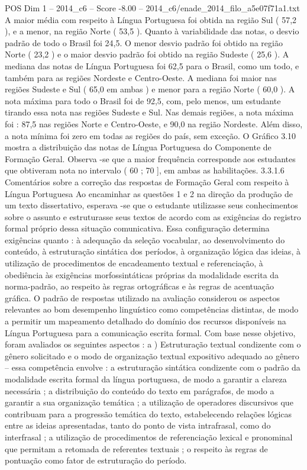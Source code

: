 \begin{textsample}{POS Dim 1 – 2014\_c6 – Score -8.00 – 2014\_c6/enade\_2014\_filo\_a5e07f71a1.txt}
A maior média com respeito à Língua Portuguesa foi obtida na região Sul ( 57,2 ), e a menor, na região Norte ( 53,5 ).
Quanto à variabilidade das notas, o desvio padrão de todo o Brasil foi 24,5.
O menor desvio padrão foi obtido na região Norte ( 23,2 ) e o maior desvio padrão foi obtido na região Sudeste ( 25,6 ).
A mediana das notas de Língua Portuguesa foi 62,5 para o Brasil, como um todo, e também para as regiões Nordeste e Centro-Oeste.
A mediana foi maior nas regiões Sudeste e Sul ( 65,0 em ambas ) e menor para a região Norte ( 60,0 ).
A nota máxima para todo o Brasil foi de 92,5, com, pelo menos, um estudante tirando essa nota nas regiões Sudeste e Sul.
Nas demais regiões, a nota máxima foi : 87,5 nas regiões Norte e Centro-Oeste, e 90,0 na região Nordeste.
Além disso, a nota mínima foi zero em todas as regiões do país, sem exceção.
O Gráfico 3.10 mostra a distribuição das notas de Língua Portuguesa do Componente de Formação Geral.
Observa -se que a maior frequência corresponde aos estudantes que obtiveram nota no intervalo ( 60 ; 70 ], em ambas as habilitações. 3.3.1.6 Comentários sobre a correção das respostas de Formação Geral com respeito à Língua Portuguesa Ao encaminhar as questões 1 e 2 na direção da produção de um texto dissertativo, esperava -se que o estudante utilizasse seus conhecimentos sobre o assunto e estruturasse seus textos de acordo com as exigências do registro formal próprio dessa situação comunicativa.
Essa configuração determina exigências quanto : à adequação da seleção vocabular, ao desenvolvimento do conteúdo, à estruturação sintática dos períodos, à organização lógica das ideias, à utilização de procedimentos de encadeamento textual e referenciação, à obediência às exigências morfossintáticas próprias da modalidade escrita da norma-padrão, ao respeito às regras ortográficas e às regras de acentuação gráfica.
O padrão de respostas utilizado na avaliação considerou os aspectos relevantes ao bom desempenho linguístico como competências distintas, de modo a permitir um mapeamento detalhado do domínio dos recursos disponíveis na Língua Portuguesa para a comunicação escrita formal.
Com base nesse objetivo, foram avaliados os seguintes aspectos : a ) Estruturação textual condizente com o gênero solicitado e o modo de organização textual expositivo adequado ao gênero – essa competência envolve : a estruturação sintática condizente com o padrão da modalidade escrita formal da língua portuguesa, de modo a garantir a clareza necessária ; a distribuição do conteúdo do texto em parágrafos, de modo a garantir a sua organização temática ; a utilização de operadores discursivos que contribuam para a progressão temática do texto, estabelecendo relações lógicas entre as ideias apresentadas, tanto do ponto de vista intrafrasal, como do interfrasal ; a utilização de procedimentos de referenciação lexical e pronominal que permitam a retomada de referentes textuais ; o respeito às regras de pontuação como fator de estruturação do período.

\end{textsample}
